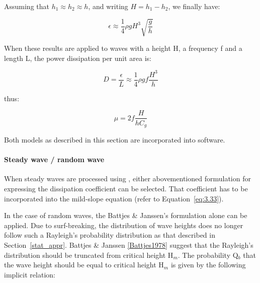 \begin{itemize}
Assuming that $h_{1} \approx h_{2} \approx h$, and writing $H=h_{1}-h_{2}$, we finally have:

\begin{equation}
  \epsilon \approx \frac{1}{4}\rho g H^{3}\sqrt{\frac{g}{h}}
  \label{eq:3.44}
\end{equation}

When these results are applied to waves with a height H, a frequency f and a
length L, the power dissipation per unit area is:

\begin{equation}
  D = \frac{\epsilon}{L} \approx \frac{1}{4}\rho gf \frac{H^{3}}{h}
  \label{eq:3.45}
\end{equation}

thus:

\begin{equation}
  \mu = 2f\frac{H}{hC_{g}}
  \label{eq:3.46}
\end{equation}
\end{itemize}

Both models as described in this section are incorporated into \artemis{} software.

\paragraph{Steady wave / random wave}\label{steady_rand_wave}

When steady waves are processed using \artemis{}, either abovementioned
formulation for expressing the dissipation coefficient can be selected. That
coefficient has to be incorporated into the mild-slope equation (refer to
Equation~\eqref{eq:3.33}).

In the case of random waves, the Battjes \& Janssen's formulation alone can be
applied. Due to surf-breaking, the distribution of wave heights does no longer
follow such a Rayleigh's probability distribution as that described in
Section~\ref{stat_appr}. Battjes \& Janssen \eqref{Battjes1978} suggest that the Rayleigh's
distribution should be truncated from critical height H${}_{m}$. The
probability Q${}_{b}$ that the wave height should be equal to critical height
H${}_{m}$ is given by the following implicit relation:

